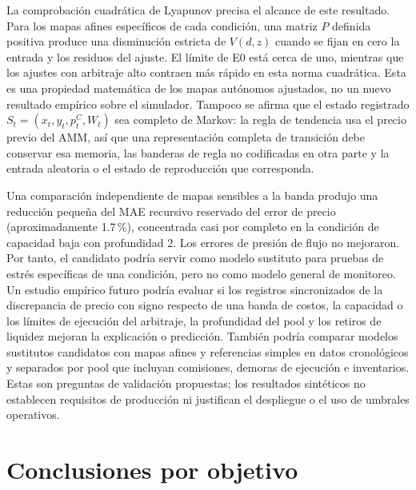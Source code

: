 La comprobación cuadrática de Lyapunov precisa el alcance de este resultado. Para los mapas afines específicos de cada condición, una matriz $P$ definida positiva produce una disminución estricta de $V(d,z)$ cuando se fijan en cero la entrada y los residuos del ajuste. El límite de E0 está cerca de uno, mientras que los ajustes con arbitraje alto contraen más rápido en esta norma cuadrática. Esta es una propiedad matemática de los mapas autónomos ajustados, no un nuevo resultado empírico sobre el simulador. Tampoco se afirma que el estado registrado $S_t=(x_t,y_t,p_t^C,W_t)$ sea completo de Markov: la regla de tendencia usa el precio previo del AMM, así que una representación completa de transición debe conservar esa memoria, las banderas de regla no codificadas en otra parte y la entrada aleatoria o el estado de reproducción que corresponda.

Una comparación independiente de mapas sensibles a la banda produjo una reducción pequeña del MAE recursivo reservado del error de precio (aproximadamente 1.7\,\%), concentrada casi por completo en la condición de capacidad baja con profundidad 2. Los errores de presión de flujo no mejoraron. Por tanto, el candidato podría servir como modelo sustituto para pruebas de estrés específicas de una condición, pero no como modelo general de monitoreo. Un estudio empírico futuro podría evaluar si los registros sincronizados de la discrepancia de precio con signo respecto de una banda de costos, la capacidad o los límites de ejecución del arbitraje, la profundidad del pool y los retiros de liquidez mejoran la explicación o predicción. También podría comparar modelos sustitutos candidatos con mapas afines y referencias simples en datos cronológicos y separados por pool que incluyan comisiones, demoras de ejecución e inventarios. Estas son preguntas de validación propuestas; los resultados sintéticos no establecen requisitos de producción ni justifican el despliegue o el uso de umbrales operativos.

\section{Conclusiones por objetivo}

